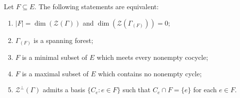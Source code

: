 Let $F \subseteq E$. The following statements are equivalent:
\begin{enumerate}
\item[(a)] $|F| = \dim(\mathcal{Z}(\Gamma))$ and $\dim(\mathcal{Z}(\Gamma_{(F)})) = 0$;
\item[(b)] $\Gamma_{(F)}$ is a spanning forest;
\item[(c)] $F$ is a minimal subset of $E$ which meets every nonempty cocycle;
\item[(d)] $F$ is a maximal subset of $E$ which contains no nonempty cycle;
\item[(e)] $\mathcal{Z}^\perp(\Gamma)$ admits a basis $\{C_e : e \in F\}$ such that $C_e \cap F = \{e\}$ for each $e \in F$.
\end{enumerate}